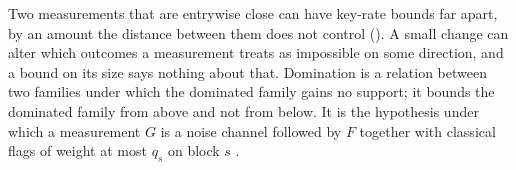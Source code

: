 
Two  measurements that are entrywise close can have key-rate
bounds far apart, by an amount the distance between them does not control
(). A small change can alter which
outcomes a measurement treats as impossible on some direction, and a bound on
its size says nothing about that. Domination is a relation between two families
under which the dominated family gains no support; it bounds the dominated
family from above and not from below. It is the hypothesis under which a measurement $G$ is
a noise channel followed by $F$ together with classical flags of weight at
most $q_s$ on block $s$ \cite[Thm.~3, Eq.~(20)]{nahar2025imperfect}.

